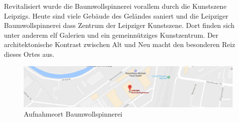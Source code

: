 \documentclass[liststotoc,bibtotoc,fontsize=14pt,]{scrreprt}
\begin{document}
	\bigskip
	Revitalisiert wurde die Baumwollspinnerei vorallem durch die Kunstszene Leipzigs. Heute sind viele Gebäude des Geländes saniert und die Leipziger Baumwollspinnerei dass Zentrum der Leipziger Kunstszene. Dort finden sich unter anderem elf Galerien und ein gemeinnütziges Kunstzentrum. Der architektonische Kontrast zwischen Alt und Neu macht den besonderen Reiz dieses Ortes aus.
		\begin{figure}[H]
			\includegraphics[width=\linewidth]{img/places/spinnerei_map.jpg}
			\caption{Aufnahmeort Baumwollspinnerei}
			\label{img:ak_map}
		\end{figure}
\end{document}
